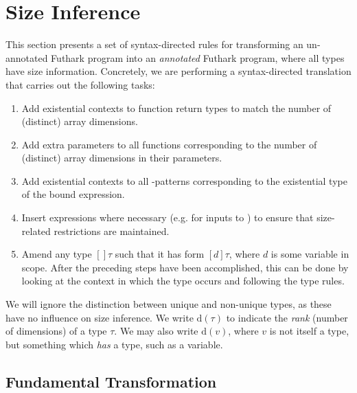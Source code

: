 \section{Size Inference}
\label{sec:size-inference}

\newcommand{\transformBnd}[1]{\mathcal{A}_{#1}^{\text{exp}}}
\newcommand{\transformFun}{\mathcal{A}^{\text{fun}}}
\newcommand{\transformLam}[1]{\mathcal{A}_{#1}^{\text{lam}}}
\newcommand{\head}{\textrm{head}}
\newcommand{\tail}{\textrm{tail}}
\newcommand{\drop}{\textrm{drop}}
\newcommand{\cons}[2]{#1 :: #2}

This section presents a set of syntax-directed rules for transforming
an un-annotated Futhark program into an \textit{annotated} Futhark
program, where all types have size information.  Concretely, we are
performing a syntax-directed translation that carries out the
following tasks:

\begin{enumerate}
\item Add existential contexts to function return types to match the
  number of (distinct) array dimensions.
\item Add extra parameters to all functions corresponding to the
  number of (distinct) array dimensions in their parameters.
\item Add existential contexts to all -patterns corresponding
  to the existential type of the bound expression.
\item Insert  expressions where necessary (e.g. for inputs
  to ) to ensure that size-related restrictions are
  maintained.
\item Amend any type $[]\tau$ such that it has form $[d]\tau$, where
  $d$ is some variable in scope.  After the preceding steps have been
  accomplished, this can be done by looking at the context in which
  the type occurs and following the type rules.
\end{enumerate}

We will ignore the distinction between unique and non-unique types, as
these have no influence on size inference.  We write $\text{d}(\tau)$
to indicate the \emph{rank} (number of dimensions) of a type $\tau$.
We may also write $\text{d}(v)$, where $v$ is not itself a type, but
something which {\em has} a type, such as a variable.

\subsection{Fundamental Transformation}
\label{sec:FundamentalTransformation}

